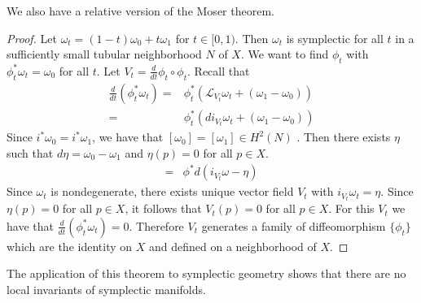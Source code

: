 We also have a relative version of the Moser theorem.

\begin{proof}
    Let $\omega_t=(1-t)\omega_0+t\omega_1$ for $t\in [0, 1)$. Then $\omega_t$ is symplectic for all $t$ in a sufficiently small tubular neighborhood $N$ of $X$. We want to find $\phi_t$ with $\phi_t^*\omega_t=\omega_0$ for all $t$. Let $V_t=\frac{d}{dt}\phi_t\circ \phi_t$. Recall that 
    \begin{align*}
        \frac{d}{dt}(\phi_t^*\omega_t)=&\phi^*_t(\mathcal L_{V_t}\omega_t+(\omega_1-\omega_0))\\
        =&\phi^*_t(di_{V_t}\omega_t+(\omega_1-\omega_0))
    \end{align*}
        Since $i^*\omega_0=i^*\omega_1$,  we have that $[\omega_0]=[\omega_1]\in H^2(N)$ . Then there exists $\eta$  such that $d\eta=\omega_0-\omega_1$ and $\eta(p)=0$ for all $p\in X$. 
    \begin{align*}
        =&\phi^*d(i_{V_t}\omega-\eta)
    \end{align*}
    Since $\omega_t$ is nondegenerate,  there exists unique vector field $V_t$ with $i_{V_t}\omega_t=\eta$. Since $\eta(p)=0$ for all $p\in X$,  it follows that $V_t(p)=0$ for all $p\in X$.
    For this $V_t$ we have that $\frac{d}{dt}(\phi^*_t\omega_t)=0$. Therefore $V_t$ generates a family of diffeomorphism $\{\phi_t\}$ which are the identity on $X$ and defined on a neighborhood of $X$.
\end{proof}
The application of this theorem to symplectic geometry shows that there are no local invariants of symplectic manifolds. 
